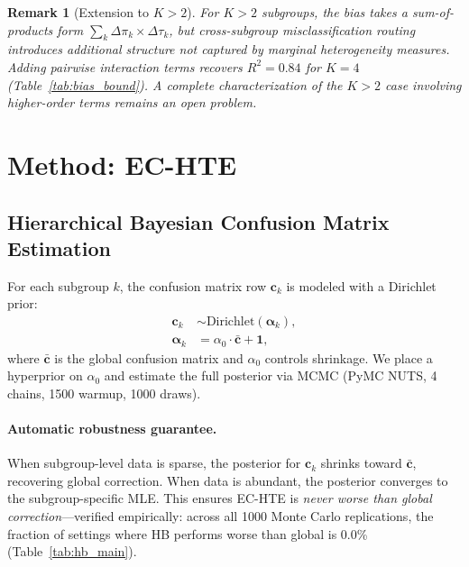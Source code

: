\documentclass[11pt,a4paper]{article}
\newtheorem{remark}{Remark}
\begin{document}
\begin{remark}[Extension to $K > 2$]
For $K > 2$ subgroups, the bias takes a sum-of-products form $\sum_k \Delta\pi_k \times \Delta\tau_k$, but cross-subgroup misclassification routing introduces additional structure not captured by marginal heterogeneity measures.
Adding pairwise interaction terms recovers $R^2 = 0.84$ for $K=4$ (Table~\ref{tab:bias_bound}).
A complete characterization of the $K > 2$ case involving higher-order terms remains an open problem.
\end{remark}

\section{Method: EC-HTE}
\label{sec:method}

\subsection{Hierarchical Bayesian Confusion Matrix Estimation}

For each subgroup $k$, the confusion matrix row $\mathbf{c}_k$ is modeled with a Dirichlet prior:
\begin{align}
\mathbf{c}_k &\sim \text{Dirichlet}(\boldsymbol{\alpha}_k), \\
\boldsymbol{\alpha}_k &= \alpha_0 \cdot \bar{\mathbf{c}} + \mathbf{1},
\end{align}
where $\bar{\mathbf{c}}$ is the global confusion matrix and $\alpha_0$ controls shrinkage.
We place a hyperprior on $\alpha_0$ and estimate the full posterior via MCMC (PyMC NUTS, 4 chains, 1500 warmup, 1000 draws).

\paragraph{Automatic robustness guarantee.}
When subgroup-level data is sparse, the posterior for $\mathbf{c}_k$ shrinks toward $\bar{\mathbf{c}}$, recovering global correction.
When data is abundant, the posterior converges to the subgroup-specific MLE.
This ensures EC-HTE is \emph{never worse than global correction}---verified empirically: across all 1000 Monte Carlo replications, the fraction of settings where HB performs worse than global is 0.0\% (Table~\ref{tab:hb_main}).
\end{document}

